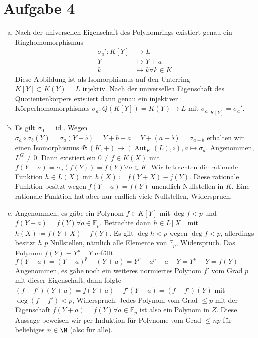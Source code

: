 \documentclass{article}
\newcommand{\id}{\operatorname{id}}
\begin{document}
    \section*{Aufgabe 4}
    \begin{enumerate}[(a)]
        \item Nach der universellen Eigenschaft des Polynomrings existiert genau ein Ringhomomorphismus 
        \begin{align*}
            \sigma_a' \colon K[Y] &\to L\\
            Y &\mapsto Y + a\\
            k &\mapsto k \forall k \in K
        \end{align*}
        Diese Abbildung ist als Isomorphismus auf den Unterring $K[Y] \subset K(Y) = L$ injektiv.
        Nach der universellen Eigenschaft des Quotientenkörpers existiert dann genau ein injektiver Körperhomomorphismus
        $\sigma_a \colon Q(K[Y]) = K(Y) \to L$ mit $\sigma_a|_{K[Y]} = \sigma_a'$.
        \item Es gilt $\sigma_0 = \id$. Wegen $\sigma_a \circ \sigma_b(Y) = \sigma_a(Y + b) = Y + b + a = Y + (a + b) = \sigma_{a+b}$ 
        erhalten wir einen Isomorphismus $\Phi \colon (K, +) \to (\operatorname{Aut}_K(L), \circ), a \mapsto \sigma_a$.
        Angenommen, $L^G \neq 0$. Dann existiert ein $0 \neq f \in K(X)$ mit $f(Y + a) = \sigma_a(f(Y)) = f(Y) \forall a\in K$.
        Wir betrachten die rationale Funktion $h \in L(X)$ mit $h(X) \coloneqq f(Y + X) - f(Y)$.
        Diese rationale Funktion besitzt wegen $f(Y + a) = f(Y)$ unendlich Nullstellen in $K$. 
        Eine rationale Funktion hat aber nur endlich viele Nullstellen, Widerspruch.
        \item Angenommen, es gäbe ein Polynom $f \in K[Y]$ mit $\deg f< p$ und $f(Y + a) = f(Y) \forall a \in \mathbb{F}_p$.
        Betrachte dann $h \in L[X]$ mit $h(X) \coloneqq f(Y + X) - f(Y)$. Es gilt $\deg h < p$ wegen $\deg f < p$, 
        allerdings besitzt $h$ $p$ Nullstellen, nämlich alle Elemente von $\mathbb{F}_p$, Widerspruch. 
        Das Polynom $f(Y) = Y^p - Y$ erfüllt $f(Y + a) = (Y + a)^p - (Y + a) = Y^p + a^p - a - Y = Y^p - Y = f(Y)$
        Angenommen, es gäbe noch ein weiteres normiertes Polynom $f'$ vom Grad $p$ mit dieser Eigenschaft, dann folgte
        $(f - f')(Y + a) = f(Y  +a) - f'(Y + a) = (f-f')(Y)$ mit $\deg (f-f') < p$, Widerspruch.
        Jedes Polynom vom Grad $\leq p$ mit der Eigenschaft $f(Y + a) = f(Y) \forall a \in \mathbb{F}_p$ ist also ein Polynom in $Z$.
        Diese Aussage beweisen wir per Induktion für Polynome vom Grad $\leq np$ für beliebiges $n\in \N$ (also für alle).

\end{enumerate}
\end{document}

